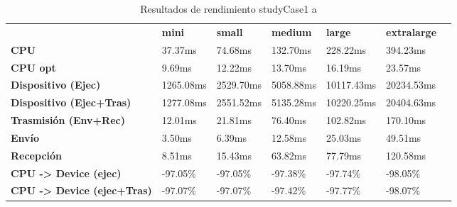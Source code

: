 \begin{table}[H]
    \centering
    \begin{tabular}{lllllll}
    \rowcolor[HTML]{DAE8FC} \ &  \textbf{mini} &  \textbf{small} &  \textbf{medium} &  \textbf{	large} &  \textbf{	extralarge} \\
    \cellcolor[HTML]{DAE8FC} \textbf{CPU} & 37.37ms & 74.68ms & 132.70ms & 	228.22ms & 	394.23ms \\
    \rowcolor[HTML]{EFEFEF} \cellcolor[HTML]{DAE8FC} \textbf{CPU opt} & 9.69ms & 12.22ms & 13.70ms & 	16.19ms & 	23.57ms \\
    \cellcolor[HTML]{DAE8FC} \textbf{Dispositivo (Ejec)} & 1265.08ms & 2529.70ms & 5058.88ms & 	10117.43ms & 	20234.53ms \\
    \rowcolor[HTML]{EFEFEF} \cellcolor[HTML]{DAE8FC} \textbf{Dispositivo (Ejec+Tras)} & 1277.08ms & 2551.52ms & 5135.28ms & 	10220.25ms & 	20404.63ms \\
    \cellcolor[HTML]{DAE8FC} \textbf{Trasmisión (Env+Rec)} & 12.01ms & 21.81ms & 76.40ms & 	102.82ms & 	170.10ms \\
    \rowcolor[HTML]{EFEFEF} \cellcolor[HTML]{DAE8FC} \textbf{Envío} & 3.50ms & 6.39ms & 12.58ms & 	25.03ms & 	49.51ms \\
    \cellcolor[HTML]{DAE8FC} \textbf{Recepción} & 8.51ms & 15.43ms & 63.82ms & 	77.79ms & 	120.58ms \\
    \rowcolor[HTML]{EFEFEF} \cellcolor[HTML]{DAE8FC} \textbf{CPU -> Device (ejec)} & -97.05\% & -97.05\% & -97.38\% & 	-97.74\% & 	-98.05\% \\
    \cellcolor[HTML]{DAE8FC} \textbf{CPU -> Device (ejec+Tras)} & -97.07\% & -97.07\% & -97.42\% & 	-97.77\% & 	-98.07\% \\
    \end{tabular}
    \caption[Resultados de rendimiento studyCase1 a]{{Resultados de rendimiento studyCase1 a}}
    \label{table_test_studyCase1_a_hw_performanceResults}
\end{table}
